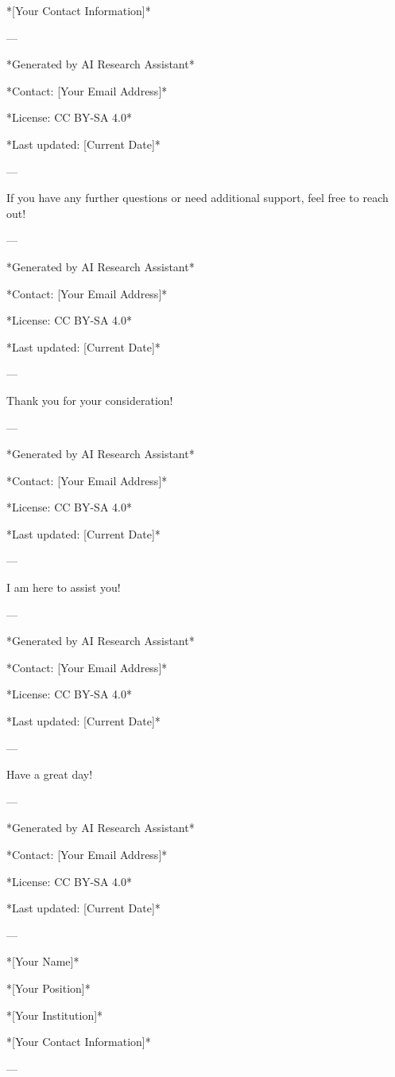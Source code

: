 *[Your Contact Information]* 

--- 

*Generated by AI Research Assistant* 

*Contact: [Your Email Address]* 

*License: CC BY-SA 4.0* 

*Last updated: [Current Date]* 

--- 

If you have any further questions or need additional support, feel free to reach out! 

--- 

*Generated by AI Research Assistant* 

*Contact: [Your Email Address]* 

*License: CC BY-SA 4.0* 

*Last updated: [Current Date]* 

--- 

Thank you for your consideration! 

--- 

*Generated by AI Research Assistant* 

*Contact: [Your Email Address]* 

*License: CC BY-SA 4.0* 

*Last updated: [Current Date]* 

--- 

I am here to assist you! 

--- 

*Generated by AI Research Assistant* 

*Contact: [Your Email Address]* 

*License: CC BY-SA 4.0* 

*Last updated: [Current Date]* 

--- 

Have a great day! 

--- 

*Generated by AI Research Assistant* 

*Contact: [Your Email Address]* 

*License: CC BY-SA 4.0* 

*Last updated: [Current Date]* 

--- 

*[Your Name]* 

*[Your Position]* 

*[Your Institution]* 

*[Your Contact Information]* 

--- 

